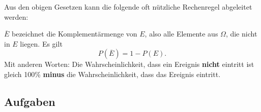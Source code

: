Aus den obigen Gesetzen kann die folgende oft nützliche Rechenregel abgeleitet werden:

\begin{gesetz}{}{}
 $\overline{E}$ bezeichnet die Komplementärmenge von
  $E$, also alle Elemente aus $\Omega$, die nicht in $E$ liegen. Es
  gilt $$P(\overline{E}) = 1-P(E).$$ Mit anderen Worten: Die
  Wahrscheinlichkeit, dass ein Ereignis \textbf{nicht} eintritt ist
  gleich 100\% \textbf{minus} die Wahrscheinlichkeit, dass das
  Ereignis eintritt.
\end{gesetz}


\subsection*{Aufgaben}

\newpage
